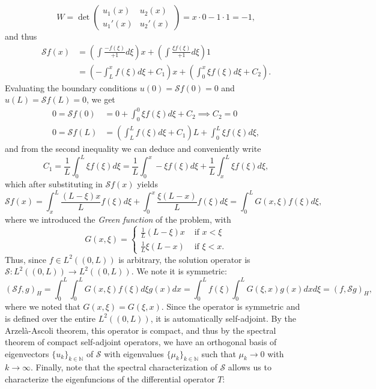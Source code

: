 \begin{equation*}
    W = \det\left(\begin{matrix}
        u_1(x) & u_2(x)\\
        u_1'(x) & u_2'(x)
    \end{matrix}\right) = x\cdot 0 - 1\cdot 1 = -1,
\end{equation*}
and thus 
\begin{align*}
    \mathcal{S}f(x) &= \left(\int\frac{-f(\xi)}{+1}d\xi\right)x + \left(\int\frac{\xi f(\xi)}{+1}d\xi\right)1\\
    &= \left(-\int_L^x f(\xi)d\xi + C_1\right)x + \left(\int_0^x \xi f(\xi)d\xi + C_2\right).
\end{align*}
Evaluating the boundary conditions $u(0)=\mathcal{S}f(0)=0$ and $u(L)=\mathcal{S}f(L)=0$, we get
\begin{align*}
    0 = \mathcal{S}f(0) &= 0 + \int_0^0 \xi f(\xi)d\xi + C_2 \implies C_2 = 0\\
    0 = \mathcal{S}f(L) &= \left(\int_L^L f(\xi)d\xi + C_1\right)L + \int_0^L \xi f(\xi)d\xi,
\end{align*}
and from the second inequality we can deduce and conveniently write
\begin{equation*}
    C_1 = \frac{1}{L}\int_0^L \xi f(\xi)d\xi = \frac{1}{L}\int_0^x -\xi f(\xi)d\xi + \frac{1}{L} \int_x^L \xi f(\xi)d\xi,
\end{equation*}
which after substituting in $\mathcal{S}f(x)$ yields
\begin{equation}
    \mathcal{S}f(x) = \int_x^L \frac{(L-\xi)x}{L}f(\xi)d\xi + \int_0^x \frac{\xi(L-x)}{L}f(\xi)d\xi = \int_0^L G(x,\xi) f(\xi)d\xi,
\end{equation}
where we introduced the \emph{Green function} of the problem, with 
\begin{equation}
    G(x,\xi) = \begin{cases}
        \frac{1}{L}(L-\xi)x &\text{ if }x<\xi\\
        \frac{1}{L}\xi(L-x) &\text{ if }\xi<x.
    \end{cases}
\end{equation}
Thus, since $f\in L^2((0,L))$ is arbitrary, the solution operator is $\mathcal{S}:L^2((0,L))\to L^2((0,L))$. We note it is symmetric: 
\begin{equation*}
    (\mathcal{S}f,g)_H = \int_0^L \int_0^L G(x,\xi)f(\xi)d\xi g(x)dx = \int_0^L f(\xi) \int_0^L G(\xi, x) g(x)dxd\xi = (f, \mathcal{S}g)_H,
\end{equation*}
where we noted that $G(x,\xi)=G(\xi,x)$. Since the operator is symmetric and is defined over the entire $L^2((0,L))$, it is automatically self-adjoint. By the Arzelà-Ascoli theorem, this operator is compact, and thus by the spectral theorem of compact self-adjoint operators, we have an orthogonal basis of eigenvectors $\{u_k\}_{k\in\mathbb{N}}$ of $\mathcal{S}$ with eigenvalues $\{\mu_k\}_{k\in \mathbb{N}}$ such that $\mu_k\to 0$ with $k\to\infty$. Finally, note that the spectral characterization of $\mathcal{S}$ allows us to characterize the eigenfuncions of the differential operator $T$:
